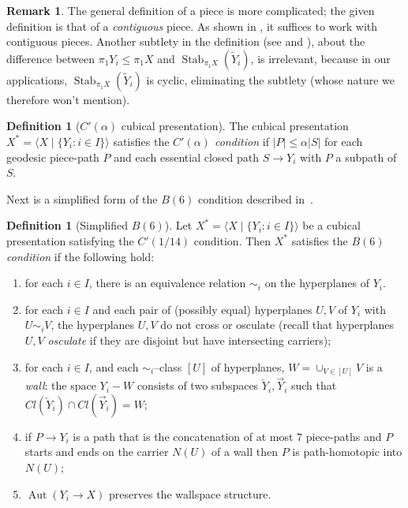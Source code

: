 \documentclass[11pt,oneside]{amsart}
\theoremstyle{definition}
\newtheorem{defn}[thm]{Definition}
\newtheorem{rem}[thm]{Remark}
\DeclareMathOperator{\Aut}{Aut}
\DeclareMathOperator{\stabilizer}{Stab}
\newcommand{\closure}[1]{Cl\left({#1}\right)}
\newcommand{\OL}{\overleftarrow}
\newcommand{\OR}{\overrightarrow}
\begin{document}
\begin{rem}\label{rem:piece-stuff}
The general definition of a piece is more complicated; the given definition is that of a \emph{contiguous} piece.  As shown in \cite{Wise:QCH}, it suffices to work with contiguous pieces.  Another subtlety in the definition (see \cite[Conv. 3.3]{Wise:QCH} and \cite[Rem. 3.10]{ArzhantsevaHagen}), about the difference between $\pi_1Y_i\leq \pi_1X$ and $\stabilizer_{\pi_1X}(\widetilde Y_i)$, is irrelevant, because in our applications, $\stabilizer_{\pi_1X}(\widetilde Y_i)$ is cyclic, eliminating the subtlety (whose nature we therefore won't mention).     
\end{rem}

\begin{defn}[$C'(\alpha)$ cubical presentation]\label{defn:c12}
The cubical presentation $X^*=\langle X\mid\{Y_i:i\in I\}\rangle$ satisfies the  \emph{$C'(\alpha)$ condition} if $|P|\leq\alpha|S|$ for each geodesic piece-path $P$ and each essential closed path $S\to Y_i$ with $P$ a subpath of $S$.
\end{defn}

Next is a simplified form of the $B(6)$ condition described in~\cite[Def. 5.1, Rem. 5.4]{Wise:QCH}.

\begin{defn}[Simplified $B(6)$] \label{defn:B6}
Let $X^*=\langle X\mid\{Y_i:i\in I\}\rangle$ be a cubical presentation satisfying the $C'(1/14)$ condition.  Then $X^*$ satisfies the \emph{$B(6)$ condition} if the following hold:
\begin{enumerate}
 \item \label{B6:equivalence} for each $i\in I$, there is an equivalence relation $\sim_i$ on the hyperplanes of $Y_i$.
 \item \label{B6:wallspace} for each $i\in I$ and each pair of (possibly equal) hyperplanes $U,V$ of $Y_i$ with $U\sim_i V$, the hyperplanes $U,V$ do not cross or osculate (recall that hyperplanes $U,V$ \emph{osculate} if they are disjoint but have intersecting carriers);
 \item \label{B6:wallspace_2} for each $i\in I$, and each $\sim_i$--class $[U]$ of hyperplanes, $W=\cup_{V\in[U]}V$ is a \emph{wall}: the space $Y_i-W$ consists of two subspaces $\OL Y_i,\OR Y_i$ such that $\closure{\OL Y_i}\cap\closure{\OR Y_i}=W$;
 \item \label{B6:homotopy} if $P\to Y_i$ is a path that is the concatenation of at most $7$ piece-paths and $P$ starts and ends on the carrier $N(U)$ of a wall then $P$ is path-homotopic into $N(U)$;

\item \label{B6:aut} $\Aut(Y_i\rightarrow X)$ preserves the wallspace structure.
\end{enumerate}
\end{defn}
\end{document}
